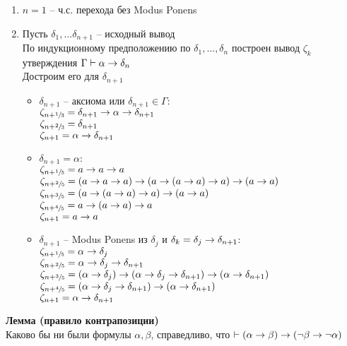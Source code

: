 \documentclass[12pt]{article}
\begin{document}
\begin{enumerate}
    \item $n = 1$ -- ч.с. перехода без Modus Ponens
    \item Пусть $\delta_1, \ldots \delta_{n+1}$ -- исходный вывод\\
    По индукционному предположению по $\delta_1, \ldots, \delta_n$ построен вывод $\zeta_k$ утверждения $\Gamma\vdash \alpha\rightarrow \delta_n$\\
    Достроим его для $\delta_{n+1}$\\
    \begin{itemize}
        \item $\delta_{n+1}$ -- аксиома или $\delta_{n+1} \in \Gamma$:\\
        $\zeta_{n+\sfrac13} = \delta_{n+1} \rightarrow \alpha \rightarrow \delta_{n+1}$\\
        $\zeta_{n+\sfrac23} = \delta_{n+1}$\\
        $\zeta_{n + 1} = \alpha \rightarrow \delta_{n+1}$ 
        \item $\delta_{n+1} = \alpha$:\\
        $\zeta_{n+\sfrac15} = a \rightarrow a \rightarrow a$\\
        $\zeta_{n+\sfrac25} = (a \rightarrow a \rightarrow a) \rightarrow (a \rightarrow (a \rightarrow a) \rightarrow a) \rightarrow (a \rightarrow a)$\\
        $\zeta_{n+\sfrac35} = (a \rightarrow (a \rightarrow a) \rightarrow a) \rightarrow (a \rightarrow a)$\\
        $\zeta_{n+\sfrac45} = a \rightarrow (a \rightarrow a) \rightarrow a$\\
        $\zeta_{n+1} = a \rightarrow a$
        \item $\delta_{n+1}$ -- Modus Ponens из $\delta_j$ и $\delta_k = \delta_j \rightarrow \delta_{n+1}$:\\
        $\zeta_{n+\sfrac15} = \alpha\rightarrow \delta_j$\\
        $\zeta_{n+\sfrac25} = \alpha \rightarrow \delta_j \rightarrow \delta_{n+1}$\\
        $\zeta_{n+\sfrac35} = (\alpha \rightarrow \delta_j) \rightarrow (\alpha \rightarrow \delta_j \rightarrow \delta_{n+1}) \rightarrow (\alpha \rightarrow \delta_{n+1})$\\
        $\zeta_{n+\sfrac45} = (\alpha \rightarrow \delta_j \rightarrow \delta_{n+1}) \rightarrow (\alpha \rightarrow \delta_{n+1})$\\
        $\zeta_{n+1} = \alpha \rightarrow \delta_{n+1}$
    \end{itemize}
\end{enumerate}
\textbf{Лемма (правило контрапозиции)}\\
Каково бы ни были формулы $\alpha, \beta$, справедливо, что $\vdash (\alpha \rightarrow \beta) \rightarrow (\lnot \beta \rightarrow \lnot \alpha)$\\
\end{document}
